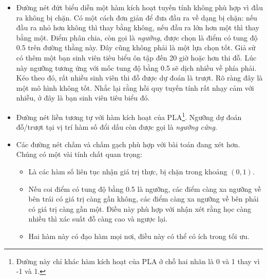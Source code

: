 \begin{itemize}
\item Đường nét đứt biểu diễn một hàm kích hoạt tuyến tính không phù hợp vì
đầu ra không bị chặn. Có một cách đơn giản để đưa đầu ra về dạng bị chặn:
nếu đầu ra nhỏ hơn không thì thay bằng không, nếu đầu ra lớn hơn một thì
thay bằng một. Điểm phân chia, còn gọi là \textit{ngưỡng}, được chọn là điểm
có tung độ 0.5 trên đường thằng này. Đây cũng không phải là một lựa chọn
tốt. Giả sử có thêm một bạn {sinh viên tiêu biểu} ôn tập đến 20 giờ hoặc hơn
thi đỗ. Lúc này ngưỡng tương ứng với mốc tung độ bằng 0.5 sẽ dịch nhiều về phía
phải. Kéo theo đó, rất nhiều sinh viên thi đỗ được dự đoán là trượt. Rõ ràng
đây là một mô hình không tốt. Nhắc lại rằng hồi quy tuyến tính rất nhạy cảm
với nhiễu, ở đây là bạn {sinh viên tiêu biểu} đó.%

\item Đường nét liền tương tự với hàm kích hoạt của PLA\footnote{Đường này chỉ khác hàm kích hoạt của PLA ở chỗ hai nhãn là 0 và 1 thay vì -1 và 1.}. Ngưỡng dự đoán đỗ/trượt tại vị trí hàm số đổi dấu còn được gọi là \textit{ngưỡng cứng}.


\item Các đường nét chấm và chấm gạch phù hợp với bài toán đang xét hơn. Chúng có một vài tính chất quan trọng:
\begin{itemize}
\item Là các hàm số liên tục nhận giá trị thực, bị chặn trong khoảng $(0, 1)$.

\item Nếu coi điểm có tung độ bằng 0.5 là ngưỡng, các điểm
càng xa ngưỡng về bên trái có giá trị càng gần không, các
điểm càng xa ngưỡng về bên phải có giá trị càng gần một. Điều này
phù hợp với nhận xét rằng học càng nhiều thì xác suất đỗ càng cao
và ngược lại.

\item Hai hàm này có đạo hàm mọi nơi, điều này có thể có ích trong tối ưu.
\end{itemize}
\end{itemize}


